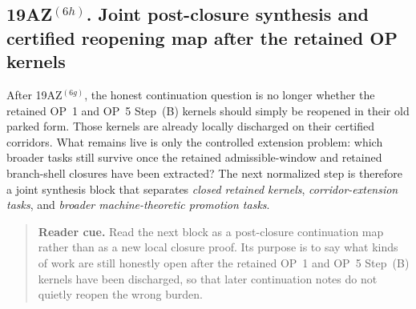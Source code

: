 \subsection*{19AZ$^{(6h)}$. Joint post-closure synthesis and certified reopening map after the retained OP kernels}
\label{sec:joint-post-closure-synthesis-certified-reopening-map-retained-op-kernels}
After 19AZ$^{(6g)}$, the honest continuation question is no longer whether the retained OP~1 and OP~5 Step~(B) kernels should simply be reopened in their old parked form. Those kernels are already locally discharged on their certified corridors. What remains live is only the controlled extension problem: which broader tasks still survive once the retained admissible-window and retained branch-shell closures have been extracted? The next normalized step is therefore a joint synthesis block that separates \emph{closed retained kernels}, \emph{corridor-extension tasks}, and \emph{broader machine-theoretic promotion tasks}.

\begin{quote}\small
\noindent\textbf{Reader cue.} Read the next block as a post-closure continuation map rather than as a new local closure proof. Its purpose is to say what kinds of work are still honestly open after the retained OP~1 and OP~5 Step~(B) kernels have been discharged, so that later continuation notes do not quietly reopen the wrong burden.
\end{quote}

